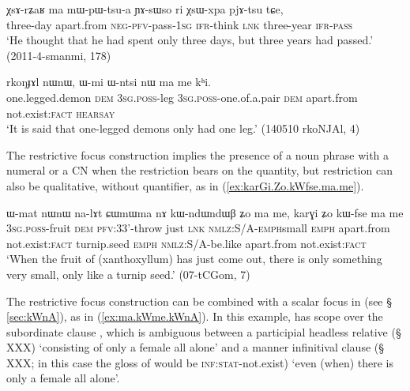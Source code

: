  \begin{exe}
\ex  \label{ex:XsArZaR}
\gll   χsɤ-rʑaʁ ma mɯ-pɯ-tsu-a ɲɤ-sɯso ri χsɯ-xpa pjɤ-tsu tɕe,  \\
three-day apart.from \textsc{neg}-\textsc{pfv}-pass-\textsc{1sg} \textsc{ifr}-think \textsc{lnk} three-year \textsc{ifr}-\textsc{pass} \\
\glt `He thought that he had spent only three days, but three years had passed.' (2011-4-smanmi, 178)
  \end{exe}
  
  \begin{exe}
\ex  \label{ex:Wmi.Wntsi.ma.me}
\gll  rkoŋɟɤl nɯnɯ, ɯ-mi ɯ-ntsi nɯ ma me kʰi.   \\
one.legged.demon \textsc{dem} \textsc{3sg}.\textsc{poss}-leg \textsc{3sg}.\textsc{poss}-one.of.a.pair \textsc{dem} apart.from not.exist:\textsc{fact} \textsc{hearsay} \\
\glt  `It is said that one-legged demons only had one leg.' (140510 rkoNJAl, 4)
  \end{exe}
  
The restrictive focus construction implies the presence of a noun phrase with a numeral or a CN when the restriction bears on the quantity, but restriction can also be qualitative, without quantifier, as in (\ref{ex:karGi.Zo.kWfse.ma.me}).

\begin{exe}
\ex \label{ex:karGi.Zo.kWfse.ma.me}
 \gll   ɯ-mat nɯnɯ na-lɤt ɕɯmɯma nɤ kɯ-ndɯ\redp{}ndɯβ ʑo ma me, karɣi ʑo kɯ-fse ma me  \\
 \textsc{3sg}.\textsc{poss}-fruit \textsc{dem} \textsc{pfv}:3\fl{}3'-throw just \textsc{lnk}  \textsc{nmlz}:S/A-\textsc{emph}\redp{}small \textsc{emph} apart.from not.exist:\textsc{fact} turnip.seed \textsc{emph} \textsc{nmlz}:S/A-be.like apart.from not.exist:\textsc{fact} \\
 \glt  `When the fruit of (xanthoxyllum) has just come out, there is only something very small, only like a turnip seed.'  (07-tCGom, 7)
  \end{exe}
  
The restrictive focus construction can be combined with a scalar focus in  (see §  \ref{sec:kWnA}), as in (\ref{ex:ma.kWme.kWnA}). In this example,  has scope over the subordinate clause , which is ambiguous between a participial headless relative (§ XXX) `consisting of only a female all alone' and a manner infinitival clause (§ XXX; in this case the gloss of  would be \textsc{inf}:\textsc{stat}-not.exist) `even (when) there is only a female all alone'.

